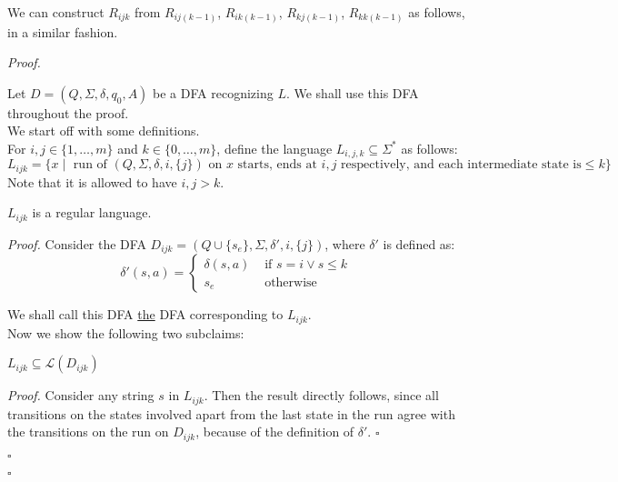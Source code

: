 \documentclass[a4paper]{article}
\newenvironment{proof}{\begin{breakbox}\textit{Proof.}}{\hfill$\square$\end{breakbox}}
\newcommand{\mc}{\mathcal}
\renewcommand{\L}{\mc{L}}
\begin{document}
\begin{note}
	\vspace{1em}

	We can construct $R_{ijk}$ from $R_{ij(k-1)}$, $R_{ik(k-1)}$, $R_{kj(k-1)}$, $R_{kk(k-1)}$ as follows, in a similar fashion.\\


\end{note}

\begin{proof}

	Let $D = (Q, \Sigma, \delta, q_0, A)$ be a DFA recognizing $L$. We shall use this DFA throughout the proof.\\

	We start off with some definitions.\\

	For $i, j \in \{1, \ldots, m\}$ and $k \in \{0, \ldots, m\}$, define the language $L_{i, j, k} \subseteq \Sigma^*$ as follows:
	\[
		L_{ijk} = \{x \mid \text{ run of } (Q, \Sigma, \delta, i, \{j\}) \text{ on } x \text{ starts, ends at } i, j \text{ respectively, and each intermediate state is} \le k \}
	\]
	Note that it is allowed to have $i, j > k$.\\

	\begin{claim}
		$L_{ijk}$ is a regular language.
	\end{claim}

	\begin{proof}
		Consider the DFA $D_{ijk} = (Q \cup \{s_e\}, \Sigma, \delta', i, \{j\})$, where $\delta'$ is defined as:
		\[
			\delta'(s, a) = \begin{cases}
				\delta(s, a) & \text{ if } s = i \lor s \le k \\
				s_e          & \text{ otherwise}
			\end{cases}
		\]

		We shall call this DFA \underline{the} DFA corresponding to $L_{ijk}$.\\

		Now we show the following two subclaims:\\

		\begin{claim}
			$L_{ijk} \subseteq \L(D_{ijk})$
		\end{claim}

		\begin{proof}
			Consider any string $s$ in $L_{ijk}$. Then the result directly follows, since all transitions on the states involved apart from the last state in the run agree with the transitions on the
			run on $D_{ijk}$, because of the definition of $\delta'$.
		\end{proof}


\end{proof}
\end{proof}
\end{document}
